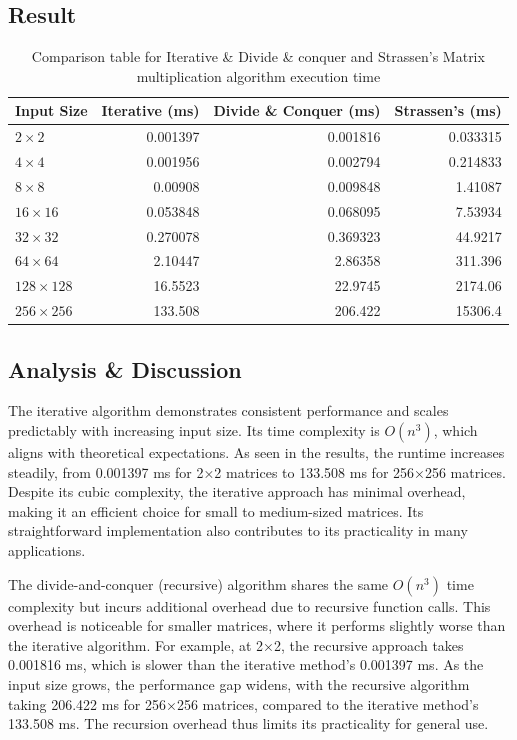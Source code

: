 \subsection{Result}

\begin{table}[H]
    \centering
    \caption{Comparison table for Iterative \& Divide \& conquer and 
    Strassen's Matrix multiplication algorithm execution time}
    \label{tab:comp}
    \begin{tabular}{lrrr}
        \toprule
        \multicolumn{1}{c}{Input Size} & \multicolumn{1}{c}{Iterative (ms)} & \multicolumn{1}{c}{Divide \& Conquer (ms)} & \multicolumn{1}{c}{Strassen's (ms)} \\
        \midrule
        $2\times2$   & 0.001397 & 0.001816 & 0.033315\\
        $4\times4$   & 0.001956  & 0.002794 & 0.214833 \\
        $8\times8$  & 0.00908  & 0.009848 & 1.41087 \\
        $16\times16$  & 0.053848 & 0.068095 & 7.53934 \\
        $32\times32$ & 0.270078 & 0.369323 & 44.9217\\
        $64\times64$ & 2.10447 & 2.86358 & 311.396 \\
        $128\times128$ & 16.5523 & 22.9745 & 2174.06  \\
        $256\times256$ & 133.508 & 206.422 & 15306.4 \\
        \bottomrule
    \end{tabular}
\end{table}

\subsection{Analysis \& Discussion}
The iterative algorithm demonstrates consistent performance 
and scales predictably with increasing input size. 
Its time complexity is $O(n^3)$, which aligns with theoretical expectations. As seen in the results, the runtime increases steadily, from 0.001397 ms for 
2×2 matrices to 133.508 ms for 
256×256 matrices. Despite its cubic complexity, the iterative approach has minimal overhead, making it an efficient choice for small to medium-sized matrices. Its straightforward implementation also contributes to its practicality in many applications.

The divide-and-conquer (recursive) algorithm shares the same 
 $O(n^3)$ time complexity but incurs additional overhead due to recursive function calls. This overhead is noticeable for smaller matrices, where it performs slightly worse than the iterative algorithm. For example, at 
2×2, the recursive approach takes 0.001816 ms, which is slower than the iterative method's 0.001397 ms. As the input size grows, the performance gap widens, with the recursive algorithm taking 206.422 ms for 
256×256 matrices, compared to the iterative method's 133.508 ms. The recursion overhead thus limits its practicality for general use.

